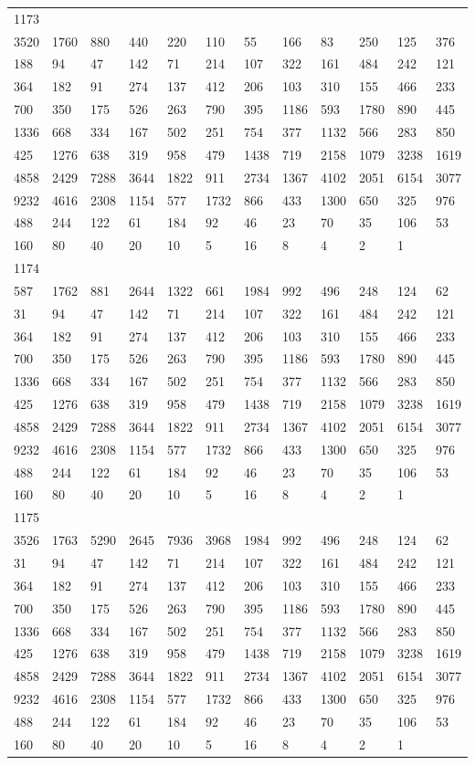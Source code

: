 \begin{longtable}{llllllllllll}
1173&&&&&&&&&&&\\
3520& 1760& 880& 440& 220& 110& 55& 166& 83& 250& 125& 376\\
188& 94& 47& 142& 71& 214& 107& 322& 161& 484& 242& 121\\
364& 182& 91& 274& 137& 412& 206& 103& 310& 155& 466& 233\\
700& 350& 175& 526& 263& 790& 395& 1186& 593& 1780& 890& 445\\
1336& 668& 334& 167& 502& 251& 754& 377& 1132& 566& 283& 850\\
425& 1276& 638& 319& 958& 479& 1438& 719& 2158& 1079& 3238& 1619\\
4858& 2429& 7288& 3644& 1822& 911& 2734& 1367& 4102& 2051& 6154& 3077\\
9232& 4616& 2308& 1154& 577& 1732& 866& 433& 1300& 650& 325& 976\\
488& 244& 122& 61& 184& 92& 46& 23& 70& 35& 106& 53\\
160& 80& 40& 20& 10& 5& 16& 8& 4& 2& 1& \\

1174&&&&&&&&&&&\\
587& 1762& 881& 2644& 1322& 661& 1984& 992& 496& 248& 124& 62\\
31& 94& 47& 142& 71& 214& 107& 322& 161& 484& 242& 121\\
364& 182& 91& 274& 137& 412& 206& 103& 310& 155& 466& 233\\
700& 350& 175& 526& 263& 790& 395& 1186& 593& 1780& 890& 445\\
1336& 668& 334& 167& 502& 251& 754& 377& 1132& 566& 283& 850\\
425& 1276& 638& 319& 958& 479& 1438& 719& 2158& 1079& 3238& 1619\\
4858& 2429& 7288& 3644& 1822& 911& 2734& 1367& 4102& 2051& 6154& 3077\\
9232& 4616& 2308& 1154& 577& 1732& 866& 433& 1300& 650& 325& 976\\
488& 244& 122& 61& 184& 92& 46& 23& 70& 35& 106& 53\\
160& 80& 40& 20& 10& 5& 16& 8& 4& 2& 1& \\

1175&&&&&&&&&&&\\
3526& 1763& 5290& 2645& 7936& 3968& 1984& 992& 496& 248& 124& 62\\
31& 94& 47& 142& 71& 214& 107& 322& 161& 484& 242& 121\\
364& 182& 91& 274& 137& 412& 206& 103& 310& 155& 466& 233\\
700& 350& 175& 526& 263& 790& 395& 1186& 593& 1780& 890& 445\\
1336& 668& 334& 167& 502& 251& 754& 377& 1132& 566& 283& 850\\
425& 1276& 638& 319& 958& 479& 1438& 719& 2158& 1079& 3238& 1619\\
4858& 2429& 7288& 3644& 1822& 911& 2734& 1367& 4102& 2051& 6154& 3077\\
9232& 4616& 2308& 1154& 577& 1732& 866& 433& 1300& 650& 325& 976\\
488& 244& 122& 61& 184& 92& 46& 23& 70& 35& 106& 53\\
160& 80& 40& 20& 10& 5& 16& 8& 4& 2& 1& \\


\end{longtable}
